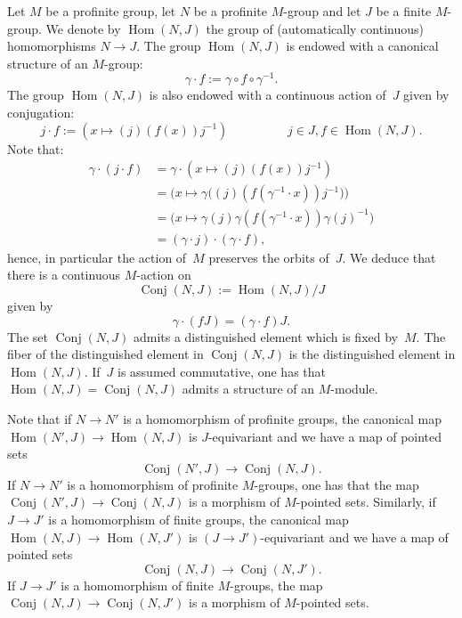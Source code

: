 \documentclass[a4paper,english,12pt]{amsart}
\DeclareMathOperator{\Conj}{Conj}
\DeclareMathOperator{\Hom}{Hom}
\DeclareMathOperator{\cont}{cont}
\numberwithin{equation}{subsection}
\begin{document}
Let $M$ be a profinite group, let $N$ be a profinite $M$-group and let $J$ be a finite $M$-group. %
We denote by $\Hom(N,J)$ the group of (automatically continuous) homomorphisms $N\to J$. The group $\Hom(N,J)$ is endowed with a canonical structure of an $M$-group:
$$\gamma\cdot f:=\gamma\circ f\circ\gamma^{-1}.$$
The group $\Hom(N,J)$ is also endowed with a continuous action of~$J$ given by conjugation: $$j\cdot f:= (x\mapsto (j)(f(x))j^{-1})\hspace{2cm}j\in J, f\in\Hom(N,J).$$
Note that: 
\begin{align*}\gamma\cdot (j\cdot f)&=\gamma \cdot (x\mapsto (j)(f(x))j^{-1})\\&=\big(x\mapsto\gamma\big((j)(f(\gamma^{-1}\cdot x))j^{-1}\big)\big)\\
&=\big(x\mapsto\gamma(j)\gamma(f(\gamma^{-1}\cdot x))\gamma(j)^{-1}\big)\\
&=(\gamma\cdot j)\cdot (\gamma\cdot f),
\end{align*}hence, in particular the action of~$M$ preserves the orbits of~$J$. We deduce that there is a continuous $M$-action on $$\Conj(N,J):=\Hom(N, J)/J$$given by $$\gamma\cdot(fJ)=(\gamma\cdot f)J.$$ The set $\Conj(N,J)$ admits a distinguished element which is fixed by~$M$. The fiber of the distinguished element in $\Conj(N,J)$ is the distinguished element in $\Hom(N,J)$. If~$J$ is assumed commutative, one has that~$\Hom(N,J)=\Conj(N,J)$ admits a structure of an $M$-module. 

Note that if $N\to N'$ is a homomorphism of profinite groups, the canonical map $\Hom(N',J)\to\Hom(N,J)$ is $J$-equivariant and we have a map of pointed sets$$\Conj(N',J)\to\Conj(N, J).$$ If $N\to N'$ is a homomorphism of profinite $M$-groups, one has that the map $\Conj(N',J)\to\Conj(N, J)$ is a morphism of $M$-pointed sets. Similarly, if $J\to J'$ is a homomorphism of finite groups, the canonical map $\Hom(N,J)\to\Hom(N, J')$ is $(J\to J')$-equivariant and we have a map of pointed sets $$\Conj(N, J)\to\Conj(N, J').$$ If $J\to J'$ is a homomorphism of finite $M$-groups, the map $\Conj(N, J)\to\Conj(N, J')$ is a morphism of $M$-pointed sets. %
\end{document}
